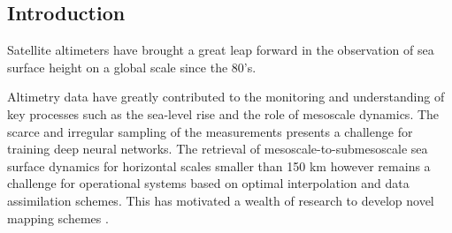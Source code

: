 \begin{bibunit}[IEEEtran.bst]


\section{Introduction}



  Satellite altimeters have brought a great leap forward in the observation of sea surface height on a global scale since the 80's. 

  
  Altimetry data have greatly contributed to the monitoring and understanding of key processes such as the sea-level rise and the role of mesoscale dynamics.
    The scarce and irregular sampling of the measurements presents a challenge for training deep neural networks.
  The retrieval of mesoscale-to-submesoscale sea surface dynamics for horizontal scales smaller than 150 km however remains a challenge for operational systems based on optimal interpolation \cite{taburetDUACSDT2018252019} and data assimilation \cite{jean-michelCopernicusGlobal122021} schemes. This has motivated a wealth of research to develop novel mapping schemes \cite{ballarottaDynamicMappingAlongTrack2020,ubelmannReconstructingOceanSurface2021,guillouMappingAltimetryForthcoming2021}.


\end{bibunit}
